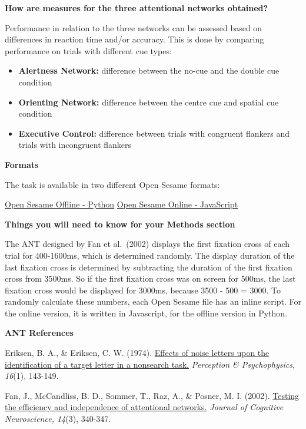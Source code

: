 \documentclass[
]{book}
\providecommand{\tightlist}{%
  \setlength{\itemsep}{0pt}\setlength{\parskip}{0pt}}
\begin{document}
\textbf{How are measures for the three attentional networks obtained?}

Performance in relation to the three networks can be assessed based on differences in reaction time and/or accuracy. This is done by comparing performance on trials with different cue types:

\begin{itemize}
\tightlist
\item
  \textbf{Alertness Network:} difference between the no-cue and the double cue condition
\item
  \textbf{Orienting Network:} difference between the centre cue and spatial cue condition
\item
  \textbf{Executive Control:} difference between trials with congruent flankers and trials with incongruent flankers
\end{itemize}

\textbf{Formats}

The task is available in two different Open Sesame formats:

\href{GitHub/ANT_OfflineWithPython.osexp}{Open Sesame Offline - Python} \textbar{} \href{GitHub/ANT_OnlineWithJS.osexp}{Open Sesame Online - JavaScript}

\textbf{Things you will need to know for your Methods section}

The ANT designed by Fan et al.~(2002) displays the first fixation cross of each trial for 400-1600ms, which is determined randomly. The display duration of the last fixation cross is determined by subtracting the duration of the first fixation cross from 3500ms. So if the first fixation cross was on screen for 500ms, the last fixation cross would be displayed for 3000ms, because 3500 - 500 = 3000. To randomly calculate these numbers, each Open Sesame file has an inline script. For the online version, it is written in Javascript, for the offline version in Python.

\textbf{ANT References}

Eriksen, B. A., \& Eriksen, C. W. (1974). \href{https://link.springer.com/content/pdf/10.3758/BF03203267.pdf}{Effects of noise letters upon the identification of a target letter in a nonsearch task.} \emph{Perception \& Psychophysics, 16}(1), 143-149.

Fan, J., McCandliss, B. D., Sommer, T., Raz, A., \& Posner, M. I. (2002). \href{http://citeseerx.ist.psu.edu/viewdoc/download?doi=10.1.1.474.442\&rep=rep1\&type=pdf}{Testing the efficiency and independence of attentional networks.} \emph{Journal of Cognitive Neuroscience, 14}(3), 340-347.
\end{document}
